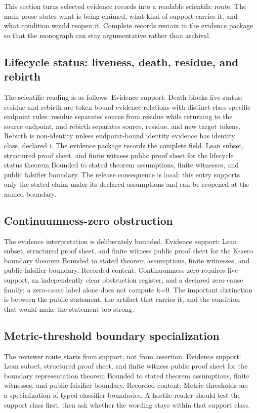 This section turns selected evidence records into a readable scientific route. The main prose states what is being claimed, what kind of support carries it, and what condition would reopen it. Complete records remain in the evidence package so that the monograph can stay argumentative rather than archival.

\subsection{Lifecycle status: liveness, death, residue, and rebirth}
The scientific reading is as follows. Evidence support: Death blocks live status; residue and rebirth are token-bound evidence relations with distinct class-specific endpoint rules: residue separates source from residue while returning to the source endpoint, and rebirth separates source, residue, and new target tokens. Rebirth is non-identity unless endpoint-bound identity evidence has identity class, declared i. The evidence package records the complete field. Lean subset, structured proof sheet, and finite witness public proof sheet for the lifecycle status theorem Bounded to stated theorem assumptions, finite witnesses, and public falsifier boundary. The release consequence is local: this entry supports only the stated claim under its declared assumptions and can be reopened at the named boundary.

\subsection{Continuumness-zero obstruction}
The evidence interpretation is deliberately bounded. Evidence support: Lean subset, structured proof sheet, and finite witness public proof sheet for the K-zero boundary theorem Bounded to stated theorem assumptions, finite witnesses, and public falsifier boundary. Recorded content: Continuumness zero requires live support, an independently clear obstruction register, and a declared zero-cause family; a zero-cause label alone does not compute k=0. The important distinction is between the public statement, the artifact that carries it, and the condition that would make the statement too strong.

\subsection{Metric-threshold boundary specialization}
The reviewer route starts from support, not from assertion. Evidence support: Lean subset, structured proof sheet, and finite witness public proof sheet for the boundary representation theorem Bounded to stated theorem assumptions, finite witnesses, and public falsifier boundary. Recorded content: Metric thresholds are a specialization of typed classifier boundaries. A hostile reader should test the support class first, then ask whether the wording stays within that support class.

